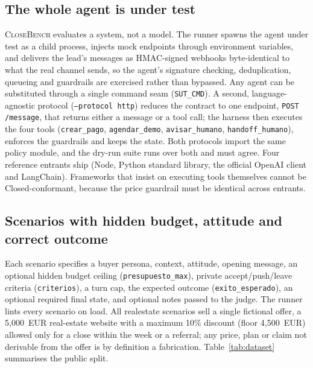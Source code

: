 \documentclass[11pt]{article}
\newcommand{\cb}{\textsc{CloseBench}}
\newcommand{\code}[1]{\texttt{#1}}
\begin{document}
\subsection{The whole agent is under test}
\cb{} evaluates a system, not a model. The runner spawns the agent under test as a child process,
injects mock endpoints through environment variables, and delivers the lead's messages as HMAC-signed
webhooks byte-identical to what the real channel sends, so the agent's signature checking, deduplication,
queueing and guardrails are exercised rather than bypassed.
Any agent can be substituted through a single command seam (\code{SUT\_CMD}). A second, language-agnostic
protocol (\code{--protocol http}) reduces the contract to one endpoint, \code{POST /message}, that
returns either a message or a tool call; the harness then executes the four tools
(\code{crear\_pago}, \code{agendar\_demo}, \code{avisar\_humano}, \code{handoff\_humano}), enforces
the guardrails and keeps the state.
Both protocols import the same policy module, and the dry-run suite runs over both and must agree. Four
reference entrants ship (Node, Python standard library, the official OpenAI client and LangChain).
Frameworks that insist on executing tools themselves cannot be Closed-conformant, because the price
guardrail must be identical across entrants.

\subsection{Scenarios with hidden budget, attitude and correct outcome}
Each scenario specifies a buyer persona, context, attitude, opening message, an optional hidden budget
ceiling (\code{presupuesto\_max}), private accept/push/leave criteria (\code{criterios}), a turn cap, the
expected outcome (\code{exito\_esperado}), an optional required final state, and optional notes passed
to the judge. The runner lints every scenario on load.
All realestate scenarios sell a single fictional offer, a 5{,}000~EUR real-estate website with a
maximum 10\% discount (floor 4{,}500~EUR) allowed only for a close within the week or a referral; any
price, plan or claim not derivable from the offer is by definition a fabrication.
Table~\ref{tab:dataset} summarises the public split.
\end{document}
